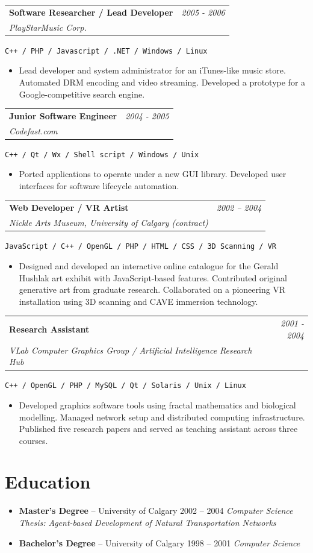 \documentclass[10pt]{article}
\makeatletter
\newcommand{\tech}[1]{\textcolor{secondary}{\textbf{#1}}}
\newcommand{\experience}[4]{%
  \vspace{4pt}
  \begin{tabular*}{\textwidth}{@{}l@{\extracolsep{\fill}}r@{}}
    \textbf{#1} & \textit{#2} \\
    \textit{\small#3} & \textit{\small#4}
  \end{tabular*}
  \vspace{-4pt}
}
\makeatother
\begin{document}
\experience{Software Researcher / Lead Developer}{2005 - 2006}{PlayStarMusic Corp.}{}
\hspace{0.5cm}\texttt{C++ / PHP / Javascript / .NET / Windows / Linux}
\begin{itemize}
    \item Lead developer and system administrator for an iTunes-like music store. Automated DRM encoding and video streaming. Developed a prototype for a Google-competitive search engine.
\end{itemize}

\experience{Junior Software Engineer}{2004 - 2005}{Codefast.com}{}
\hspace{0.5cm}\texttt{C++ / Qt / Wx / Shell script / Windows / Unix}
\begin{itemize}
    \item Ported applications to operate under a new GUI library. Developed user interfaces for software lifecycle automation.
\end{itemize}

\experience{Web Developer / VR Artist}{2002 -- 2004}{Nickle Arts Museum, University of Calgary (contract)}{}
\hspace{0.5cm}\texttt{JavaScript / C++ / OpenGL / PHP / HTML / CSS / 3D Scanning / VR}
\begin{itemize}
    \item Designed and developed an interactive online catalogue for the Gerald Hushlak art exhibit with JavaScript-based features. Contributed original generative art from graduate research. Collaborated on a pioneering VR installation using 3D scanning and CAVE immersion technology.
\end{itemize}

\experience{Research Assistant}{2001 - 2004}{VLab Computer Graphics Group / Artificial Intelligence Research Hub}{}
\hspace{0.5cm}\texttt{C++ / OpenGL / PHP / MySQL / Qt / Solaris / Unix / Linux}
\begin{itemize}
    \item Developed graphics software tools using fractal mathematics and biological modelling. Managed network setup and distributed computing infrastructure. Published five research papers and served as teaching assistant across three courses.
\end{itemize}

\section*{Education}
\begin{itemize}
    \item \tech{Master's Degree} -- University of Calgary \hfill 2002 -- 2004
    \textit{\small Computer Science}
    \textit{\small Thesis: Agent-based Development of Natural Transportation Networks}
    \item \tech{Bachelor's Degree} -- University of Calgary \hfill 1998 -- 2001
    \textit{\small Computer Science}
\end{itemize}
\end{document}
